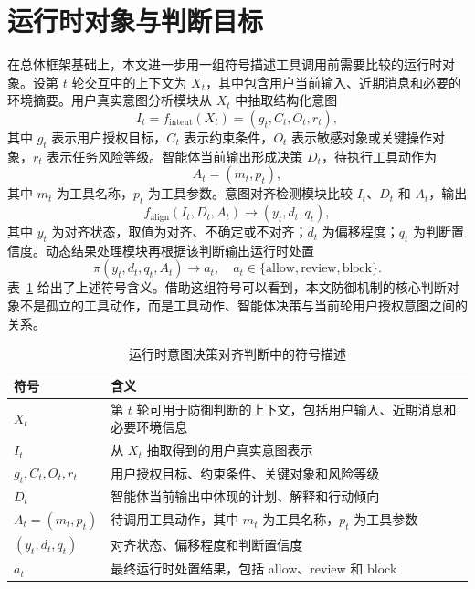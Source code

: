 \section{运行时对象与判断目标}

在总体框架基础上，本文进一步用一组符号描述工具调用前需要比较的运行时对象。设第 \(t\) 轮交互中的上下文为 \(X_t\)，其中包含用户当前输入、近期消息和必要的环境摘要。用户真实意图分析模块从 \(X_t\) 中抽取结构化意图
\[
  I_t = f_{\mathrm{intent}}(X_t) = (g_t, C_t, O_t, r_t),
\]
其中 \(g_t\) 表示用户授权目标，\(C_t\) 表示约束条件，\(O_t\) 表示敏感对象或关键操作对象，\(r_t\) 表示任务风险等级。智能体当前输出形成决策 \(D_t\)，待执行工具动作为
\[
  A_t = (m_t, p_t),
\]
其中 \(m_t\) 为工具名称，\(p_t\) 为工具参数。意图对齐检测模块比较 \(I_t\)、\(D_t\) 和 \(A_t\)，输出
\[
  f_{\mathrm{align}}(I_t, D_t, A_t) \rightarrow (y_t, d_t, q_t),
\]
其中 \(y_t\) 为对齐状态，取值为对齐、不确定或不对齐；\(d_t\) 为偏移程度；\(q_t\) 为判断置信度。动态结果处理模块再根据该判断输出运行时处置
\[
  \pi(y_t, d_t, q_t, A_t) \rightarrow a_t,\quad a_t \in \{\text{allow}, \text{review}, \text{block}\}.
\]
表~\ref{tab:chap04-symbols} 给出了上述符号含义。借助这组符号可以看到，本文防御机制的核心判断对象不是孤立的工具动作，而是工具动作、智能体决策与当前轮用户授权意图之间的关系。

\begin{table}[htbp]
  \centering
  \caption{运行时意图决策对齐判断中的符号描述}
  \label{tab:chap04-symbols}
  \small
  \renewcommand{\arraystretch}{1.2}
  \begin{tabular}{@{}p{}p{}@{}}
    \toprule
    符号 & 含义 \\
    \midrule
    \(X_t\) & 第 \(t\) 轮可用于防御判断的上下文，包括用户输入、近期消息和必要环境信息 \\
    \(I_t\) & 从 \(X_t\) 抽取得到的用户真实意图表示 \\
    \(g_t, C_t, O_t, r_t\) & 用户授权目标、约束条件、关键对象和风险等级 \\
    \(D_t\) & 智能体当前输出中体现的计划、解释和行动倾向 \\
    \(A_t=(m_t,p_t)\) & 待调用工具动作，其中 \(m_t\) 为工具名称，\(p_t\) 为工具参数 \\
    \((y_t,d_t,q_t)\) & 对齐状态、偏移程度和判断置信度 \\
    \(a_t\) & 最终运行时处置结果，包括 allow、review 和 block \\
    \bottomrule
  \end{tabular}
\end{table}

